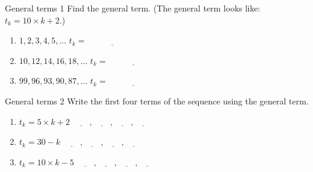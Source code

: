 \documentclass[12pt,letterpaper]{article}
\begin{document}
\begin{problem}{General terms 1}
 Find the general term. (The general term looks like: $t_k = 10 \times k + 2$.)

\begin{enumerate}[\hspace{.5cm}a.]
\item $1, 2, 3, 4, 5, \ldots$ \hfill $t_k = \underline{\hspace{6em}}$
\item $10, 12, 14, 16, 18, \ldots$ \hfill $t_k = \underline{\hspace{6em}}$
\item $99, 96, 93, 90, 87, \ldots$ \hfill $t_k = \underline{\hspace{6em}}$
\end{enumerate}
\end{problem}

\begin{problem}{General terms 2}
 Write the first four terms of the sequence using the general term.

\begin{enumerate}[\hspace{.5cm}a.]
\item $t_k = 5 \times k + 2$ \hfill
$\underline{\hspace{2em}}, \underline{\hspace{2em}}, \underline{\hspace{2em}}, \underline{\hspace{2em}}$
\item $t_k = 30 - k$ \hfill
$\underline{\hspace{2em}}, \underline{\hspace{2em}}, \underline{\hspace{2em}}, \underline{\hspace{2em}}$
\item $t_k = 10 \times k - 5$ \hfill
$\underline{\hspace{2em}}, \underline{\hspace{2em}}, \underline{\hspace{2em}}, \underline{\hspace{2em}}$
\end{enumerate}
\end{problem}
\end{document}
